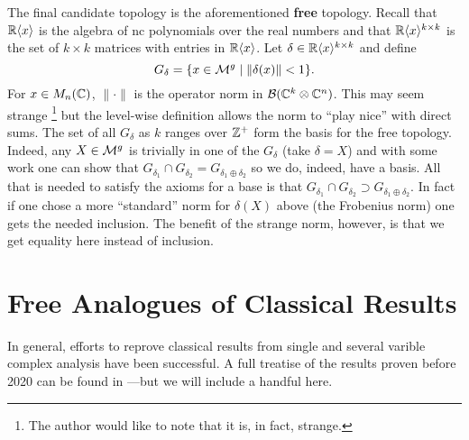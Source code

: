 The final candidate topology is the aforementioned \textbf{free} topology.
Recall that \(\mathbb{R} \langle x \rangle \) is the algebra of nc polynomials over the
real numbers and that
\(\mathbb{R} \langle x \rangle ^{k\times k}\) is the set of \(k \times k\) matrices
with entries in \(\mathbb{R} \langle x \rangle \). Let
\(\delta \in \mathbb{R} \langle x \rangle ^{k\times k}\) and define
\[
  G_\delta = \{x \in \mathcal{M}^{g} \mid \| \delta(x) \| <1\}.
\]
For \(x \in M_n(\mathbb{C})\), \(\|\cdot \|\) is the operator norm in
\(\mathcal{B}(\mathbb{C}^k\otimes\mathbb{C}^n)\). This may seem strange
\footnote{The author would like to note that it is, in fact, strange.}
but the level-wise definition allows the norm to ``play nice'' with direct sums.
The set of all \(G_\delta\) as \(k\) ranges over \(\mathbb{Z} ^+\) form the basis for
the free topology. Indeed, any \(X \in \mathcal{M}^{g} \) is trivially in one of the
\(G_\delta\) (take \(\delta=X\)) and with some work one can show that
\(G_{\delta_1} \cap G_{\delta_2}= G_{\delta_1\oplus \delta_2}\) so we do,
indeed, have a basis. All that is needed to satisfy the axioms for a base is that
\(G_{\delta_1} \cap G_{\delta_2} \supset G_{\delta_1\oplus \delta_2}\). In
fact if one chose a more ``standard'' norm for \(\delta(X)\) above (\eg the
Frobenius norm) one gets the needed inclusion. The benefit of the strange norm,
however, is that we get equality here instead of inclusion.

\section{Free Analogues of Classical Results}%
\label{sec:freeanal}

In general, efforts to reprove classical results from single and several varible
complex analysis have been successful. A full treatise of the results proven
before 2020 can be found in \cite{aglerOperator2019}---but we will include a
handful here.

